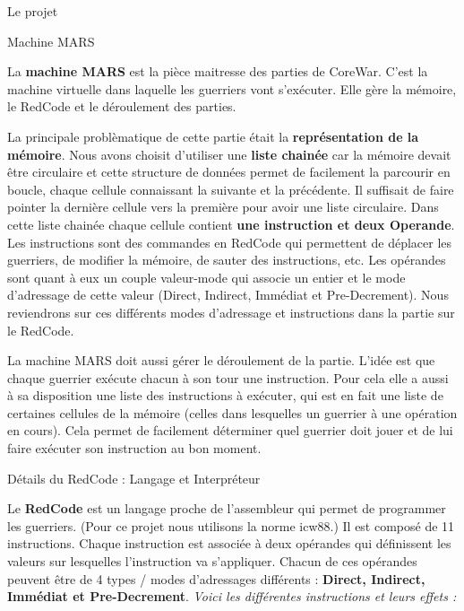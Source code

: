 \documentclass[a4paper, 10pt]{article}
\begin{document}
\begin{section}{Le projet}
        
        \begin{subsection}{Machine MARS}
            \par
                La \textbf{machine MARS} est la pièce maitresse des parties de CoreWar. C'est la machine virtuelle dans laquelle les guerriers vont s'exécuter. Elle gère la mémoire, le RedCode et le déroulement des parties. 
                \medskip
            \par
                La principale problèmatique de cette partie était la \textbf{représentation de la mémoire}.
                Nous avons choisit d'utiliser une \textbf{liste chainée} car la mémoire devait être circulaire et cette structure de données permet de facilement la parcourir en boucle, chaque cellule connaissant la suivante et la précédente. Il suffisait de faire pointer la dernière cellule vers la première pour avoir une liste circulaire.
                Dans cette liste chainée chaque cellule contient \textbf{une instruction et deux Operande}. Les instructions sont des commandes en RedCode qui permettent de déplacer les guerriers, de modifier la mémoire, de sauter des instructions, etc. Les opérandes sont quant à eux un couple valeur-mode qui associe un entier et le mode d'adressage de cette valeur (Direct, Indirect, Immédiat et Pre-Decrement). Nous reviendrons sur ces différents modes d'adressage et instructions dans la partie sur le RedCode.
                \medskip
            \par
                La machine MARS doit aussi gérer le déroulement de la partie. L'idée est que chaque guerrier exécute chacun à son tour une instruction. Pour cela elle a aussi à sa disposition une liste des instructions à exécuter, qui est en fait une liste de certaines cellules de la mémoire (celles dans lesquelles un guerrier à une opération en cours). Cela permet de facilement déterminer quel guerrier doit jouer et de lui faire exécuter son instruction au bon moment.
        \end{subsection}

        \begin{subsection}{Détails du RedCode : Langage et Interpréteur}
            \par
                Le \textbf{RedCode} est un langage proche de l'assembleur qui permet de programmer les guerriers. (Pour ce projet nous utilisons la norme icw88.) Il est composé de 11 instructions. Chaque instruction est associée à deux opérandes qui définissent les valeurs sur lesquelles l'instruction va s'appliquer. Chacun de ces opérandes peuvent être de 4 types / modes d'adressages différents : \textbf{Direct, Indirect, Immédiat et Pre-Decrement}.
                \bigskip \newline
                    \textit{Voici les différentes instructions et leurs effets :}
                \bigskip


\end{subsection}
\end{section}
\end{document}
